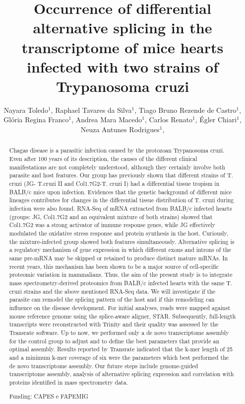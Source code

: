 \documentclass[twoside]{article}
\title{\vspace{-15mm}\fontsize{24pt}{10pt}\selectfont\textbf{ Occurrence of differential alternative splicing in the transcriptome of mice hearts infected with two strains of Trypanosoma cruzi }} %
\author{ Nayara Toledo$^{1}$, Raphael Tavares da Silva$^{1}$, Tiago Bruno Rezende de Castro$^{1}$, Glória Regina Franco$^{1}$, Andrea Mara Macedo$^{1}$, Carlos Renato$^{1}$, Égler Chiari$^{1}$, Neuza Antunes Rodrigues$^{1}$, }
\affil{ 1 Universidade Federal de Minas Gerais

 }
\date{}
\begin{document}
  
  
  \maketitle %
  
  
  \thispagestyle{fancy} %
  
  
  \begin{abstract}
  Chagas disease is a parasitic infection caused by the protozoan Trypanosoma cruzi. Even after 100 years of its description, the causes of the different clinical manifestations are not completely understood, although they certainly involve both parasite and host features. Our group has previously shown that different strains of T. cruzi (JG- T.cruzi II and Col1.7G2-T. cruzi I) had a differential tissue tropism in BALB/c mice upon infection. Evidences that the genetic background of different mice lineages contributes for changes in the differential tissue distribution of T. cruzi during infection were also found. RNA-Seq of mRNA extracted from BALB/c infected hearts (groups: JG, Col1.7G2 and an equivalent mixture of both strains) showed that Col1.7G2 was a strong activator of immune response genes, while JG effectively modulated the oxidative stress response and protein synthesis in the host. Curiously, the mixture-infected group showed both features simultaneously. Alternative splicing is a regulatory mechanism of gene expression in which different exons and introns of the same pre-mRNA may be skipped or retained to produce distinct mature mRNAs. In recent years, this mechanism has been shown to be a major source of cell-specific proteomic variation in mammalians. Thus, the aim of the present study is to integrate mass spectrometry-derived proteomics from BALB/c infected hearts with the same T. cruzi strains and the above mentioned RNA-Seq data. We will investigate if the parasite can remodel the splicing pattern of the host and if this remodeling can influence on the disease development. For initial analyses, reads were mapped against mouse reference genome using the splice-aware aligner, STAR. Subsequently, full-length transcripts were reconstructed with Trinity and their quality was assessed by the Transrate software. Up to now, we performed only a de novo transcriptome assembly for the control group to adjust and to define the best parameters that provide an optimal assembly. Results reported by Transrate indicated that the k-mer length of 25 and a minimum k-mer coverage of six were the parameters which best performed the de novo transcriptome assembly. Our future steps include genome-guided transcriptome assembly, analysis of alternative splicing expression and correlation with proteins identified in mass spectrometry data.
  
  Funding: CAPES e FAPEMIG \\ 
  \end{abstract}
  
\end{document}
